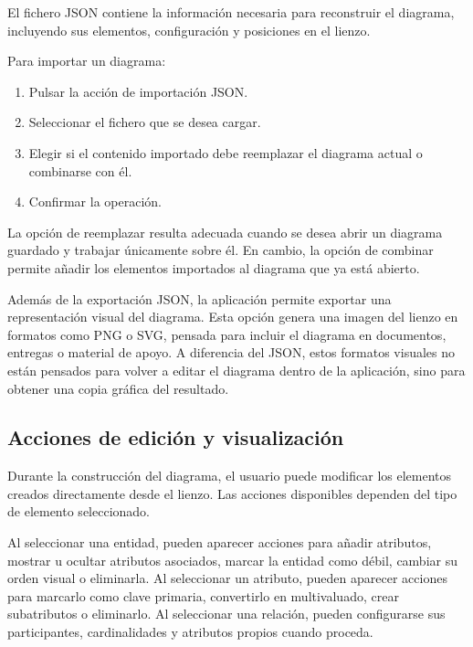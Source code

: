 El fichero JSON contiene la información necesaria para reconstruir el diagrama, incluyendo sus elementos, configuración y posiciones en el lienzo.

Para importar un diagrama:

\begin{enumerate}
    \item Pulsar la acción de importación JSON.
    \item Seleccionar el fichero que se desea cargar.
    \item Elegir si el contenido importado debe reemplazar el diagrama actual o combinarse con él.
    \item Confirmar la operación.
\end{enumerate}


La opción de reemplazar resulta adecuada cuando se desea abrir un diagrama guardado y trabajar únicamente sobre él. En cambio, la opción de combinar permite añadir los elementos importados al diagrama que ya está abierto.

Además de la exportación JSON, la aplicación permite exportar una representación visual del diagrama. Esta opción genera una imagen del lienzo en formatos como PNG o SVG, pensada para incluir el diagrama en documentos, entregas o material de apoyo. A diferencia del JSON, estos formatos visuales no están pensados para volver a editar el diagrama dentro de la aplicación, sino para obtener una copia gráfica del resultado.

\subsection{Acciones de edición y visualización}

Durante la construcción del diagrama, el usuario puede modificar los elementos creados directamente desde el lienzo. Las acciones disponibles dependen del tipo de elemento seleccionado.

Al seleccionar una entidad, pueden aparecer acciones para añadir atributos, mostrar u ocultar atributos asociados, marcar la entidad como débil, cambiar su orden visual o eliminarla. Al seleccionar un atributo, pueden aparecer acciones para marcarlo como clave primaria, convertirlo en multivaluado, crear subatributos o eliminarlo. Al seleccionar una relación, pueden configurarse sus participantes, cardinalidades y atributos propios cuando proceda.

